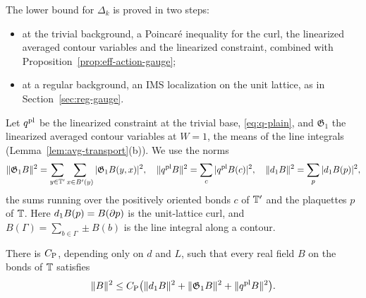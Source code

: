 The lower bound for $\Delta_k$ is proved in two steps:
\begin{itemize}
\item at the trivial background, a Poincar\'e inequality for the curl, the linearized averaged contour variables and the linearized constraint, combined with Proposition~\ref{prop:eff-action-gauge};
\item at a regular background, an IMS localization on the unit lattice, as in Section~\ref{sec:reg-gauge}.
\end{itemize}
Let $q^{\rm pl}$ be the linearized constraint at the trivial base, \eqref{eq:q-plain}, and $\mathfrak G_1$ the linearized averaged contour variables at $W=1$, the means of the line integrals (Lemma~\ref{lem:avg-transport}(b)). We use the norms
\[
\|\mathfrak G_1B\|^2=\sum_{y\in\mathbb T'}\sum_{x\in B'(y)}|\mathfrak G_1B(y,x)|^2,\quad\|q^{\rm pl}B\|^2=\sum_c|q^{\rm pl}B(c)|^2,\quad\|d_1 B\|^2=\sum_p|d_1 B(p)|^2,
\]
the sums running over the positively oriented bonds $c$ of $\mathbb T'$ and the plaquettes $p$ of $\mathbb T$. Here $d_1 B(p)=B(\partial p)$ is the unit-lattice curl, and $B(\Gamma)=\sum_{b\in\Gamma}\pm B(b)$ is the line integral along a contour.

\begin{lemma}\label{lem:poincare-step}
There is $C_{\rm P}$, depending only on $d$ and $L$, such that every real field $B$ on the bonds of $\mathbb T$ satisfies
\[
\|B\|^2\le C_{\rm P}\big(\|d_1 B\|^2+\|\mathfrak G_1B\|^2+\|q^{\rm pl}B\|^2\big).
\]
\end{lemma}

